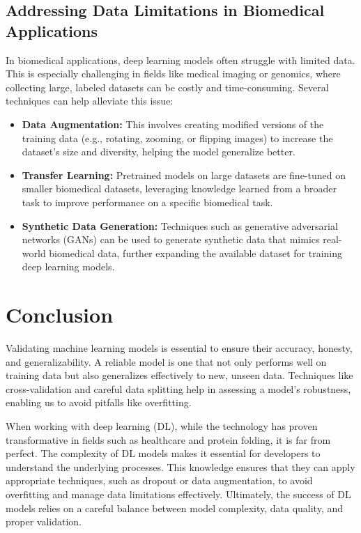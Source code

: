 \documentclass{llncs}
\begin{document}
\subsection{Addressing Data Limitations in Biomedical Applications}
In biomedical applications, deep learning models often struggle with limited data. This is especially challenging in fields like medical imaging or genomics, where collecting large, labeled datasets can be costly and time-consuming. Several techniques can help alleviate this issue:

\begin{itemize}
	\item \textbf{Data Augmentation:} This involves creating modified versions of the training data (e.g., rotating, zooming, or flipping images) to increase the dataset's size and diversity, helping the model generalize better.
	\item \textbf{Transfer Learning:} Pretrained models on large datasets are fine-tuned on smaller biomedical datasets, leveraging knowledge learned from a broader task to improve performance on a specific biomedical task.
	\item \textbf{Synthetic Data Generation:} Techniques such as generative adversarial networks (GANs) can be used to generate synthetic data that mimics real-world biomedical data, further expanding the available dataset for training deep learning models.
\end{itemize}


\section{Conclusion}

Validating machine learning models is essential to ensure their accuracy, honesty, and generalizability. A reliable model is one that not only performs well on training data but also generalizes effectively to new, unseen data. Techniques like cross-validation and careful data splitting help in assessing a model's robustness, enabling us to avoid pitfalls like overfitting.

When working with deep learning (DL), while the technology has proven transformative in fields such as healthcare and protein folding, it is far from perfect. The complexity of DL models makes it essential for developers to understand the underlying processes. This knowledge ensures that they can apply appropriate techniques, such as dropout or data augmentation, to avoid overfitting and manage data limitations effectively. Ultimately, the success of DL models relies on a careful balance between model complexity, data quality, and proper validation.
\end{document}
